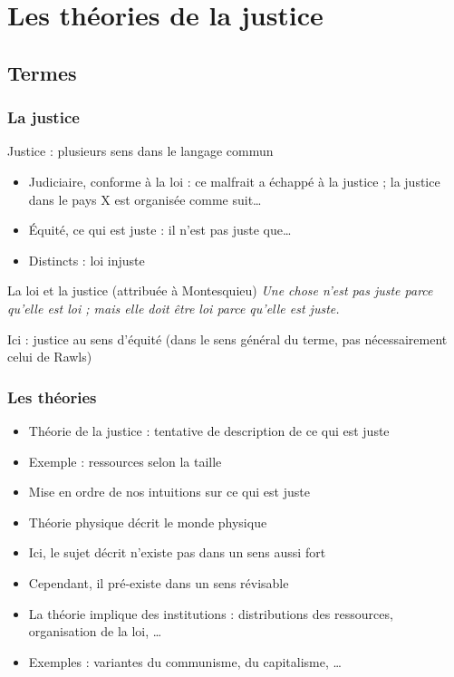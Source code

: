 \documentclass[french]{beamer}
\begin{document}
\section{Les théories de la justice}
\subsection{Termes}
\begin{frame}
	\frametitle{La justice}
  Justice : plusieurs sens dans le langage commun
	\begin{itemize}
		\item Judiciaire, conforme à la loi : ce malfrait a échappé à la justice ; la justice dans le pays X est organisée comme suit…
		\item Équité, ce qui est juste : il n’est pas juste que…
		\item Distincts : loi injuste
	\end{itemize}
	\begin{block}{La loi et la justice (attribuée à Montesquieu)}
    \emph{Une chose n’est pas juste parce qu’elle est loi ; mais elle doit être loi parce qu’elle est juste.}
  \end{block}
  Ici : justice au sens d’équité {\small (dans le sens général du terme, pas nécessairement celui de Rawls)}
\end{frame}

\begin{frame}
	\frametitle{Les théories}
	\begin{itemize}
		\item Théorie de la justice : tentative de description de ce qui est juste
    \item Exemple : ressources selon la taille
    \item Mise en ordre de nos intuitions sur ce qui est juste
		\item Théorie physique décrit le monde physique
		\item Ici, le sujet décrit n’existe pas dans un sens aussi fort
    \item Cependant, il pré-existe dans un sens révisable
    \item La théorie implique des institutions : distributions des ressources, organisation de la loi, …
    \item Exemples : variantes du communisme, du capitalisme, …
	\end{itemize}
\end{frame}
\end{document}
